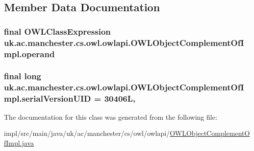 \subsection{Member Data Documentation}
\hypertarget{classuk_1_1ac_1_1manchester_1_1cs_1_1owl_1_1owlapi_1_1_o_w_l_object_complement_of_impl_a43b14e506d2ad556bb7b5ade25c9ff84}{
\subsubsection[{operand}]{\setlength{\rightskip}{0pt plus 5cm}final {\bf O\-W\-L\-Class\-Expression} uk.\-ac.\-manchester.\-cs.\-owl.\-owlapi.\-O\-W\-L\-Object\-Complement\-Of\-Impl.\-operand\hspace{0.3cm}{\ttfamily [private]}}}\label{classuk_1_1ac_1_1manchester_1_1cs_1_1owl_1_1owlapi_1_1_o_w_l_object_complement_of_impl_a43b14e506d2ad556bb7b5ade25c9ff84}
\hypertarget{classuk_1_1ac_1_1manchester_1_1cs_1_1owl_1_1owlapi_1_1_o_w_l_object_complement_of_impl_a1e1705b06d0a20131912d060cc8ca943}{
\subsubsection[{serial\-Version\-U\-I\-D}]{\setlength{\rightskip}{0pt plus 5cm}final long uk.\-ac.\-manchester.\-cs.\-owl.\-owlapi.\-O\-W\-L\-Object\-Complement\-Of\-Impl.\-serial\-Version\-U\-I\-D = 30406\-L\hspace{0.3cm}{\ttfamily [static]}, {\ttfamily [private]}}}\label{classuk_1_1ac_1_1manchester_1_1cs_1_1owl_1_1owlapi_1_1_o_w_l_object_complement_of_impl_a1e1705b06d0a20131912d060cc8ca943}


The documentation for this class was generated from the following file\-:\begin{DoxyCompactItemize}
\item 
impl/src/main/java/uk/ac/manchester/cs/owl/owlapi/\hyperlink{_o_w_l_object_complement_of_impl_8java}{O\-W\-L\-Object\-Complement\-Of\-Impl.\-java}\end{DoxyCompactItemize}
